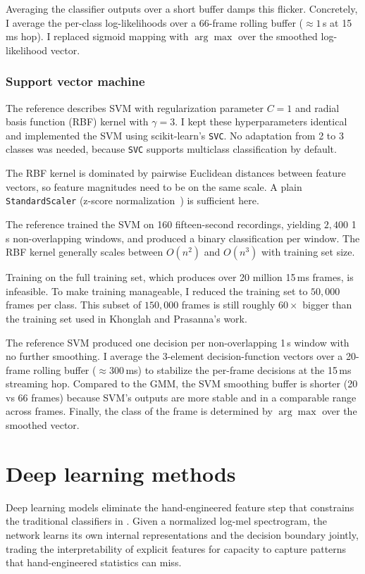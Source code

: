 Averaging the classifier outputs over a short buffer damps this flicker.
Concretely, I average the per-class log-likelihoods over a 66-frame rolling buffer ($\approx 1$\,s at 15\,ms hop).
I replaced sigmoid mapping with $\arg\max$ over the smoothed log-likelihood vector.

\subsubsection{Support vector machine}

The reference describes SVM with regularization parameter $C = 1$ and radial basis function (RBF) kernel with $\gamma = 3$.
I kept these hyperparameters identical and implemented the SVM using scikit-learn's \texttt{SVC}.
No adaptation from 2 to 3 classes was needed, because \texttt{SVC} supports multiclass classification by default.

The RBF kernel is dominated by pairwise Euclidean distances between feature vectors, so feature magnitudes need to be on the same scale.
A plain \texttt{StandardScaler} (z-score normalization~\cite{han2012preprocessing}) is sufficient here.

The reference trained the SVM on 160 fifteen-second recordings, yielding $2{,}400$ 1\,s non-overlapping windows, and produced a binary classification per window.
The RBF kernel generally scales between $O(n^2)$ and $O(n^3)$ with training set size.

Training on the full training set, which produces over 20 million 15\,ms frames, is infeasible.
To make training manageable, I reduced the training set to $50{,}000$ frames per class.
This subset of $150{,}000$ frames is still roughly $60\times$ bigger than the training set used in Khonglah and Prasanna's work.

The reference SVM produced one decision per non-overlapping 1\,s window with no further smoothing.
I average the 3-element decision-function vectors over a 20-frame rolling buffer ($\approx 300$\,ms) to stabilize the per-frame decisions at the 15\,ms streaming hop.
Compared to the GMM, the SVM smoothing buffer is shorter (20 vs 66 frames) because SVM's outputs are more stable and in a comparable range across frames.
Finally, the class of the frame is determined by $\arg\max$ over the smoothed vector.

\section{Deep learning methods}
\label{sec:neural_methods}
Deep learning models eliminate the hand-engineered feature step that constrains the traditional classifiers in .
Given a normalized log-mel spectrogram, the network learns its own internal representations and the decision boundary jointly, trading the interpretability of explicit features for capacity to capture patterns that hand-engineered statistics can miss.

